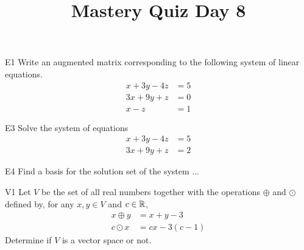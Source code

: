 \documentclass{sbgLAquiz}
\title{Mastery Quiz Day 8 }
\begin{document}
\begin{problem}{E1}
Write an augmented matrix corresponding to the following system of linear equations.
\begin{align*}
x+3y-4z &= 5 \\
3x+9y+z &= 0 \\
x-z &= 1
\end{align*}
\end{problem}

\begin{problem}{E3}
Solve the system of equations
\begin{align*}
x+3y-4z &= 5 \\
3x+9y+z &= 2
\end{align*}
\end{problem}
\newpage

\begin{problem}{E4}
Find a basis for the solution set of the system ...
\end{problem}

\begin{problem}{V1}
Let $V$ be the  set of all real numbers together with the operations $\oplus$ and $\odot$ defined by, for any $x,y \in V$ and $c \in \mathbb{R}$,
\begin{align*}
x\oplus y  &= x+y-3 \\
c \odot x &= cx-3(c-1)
\end{align*}
Determine if $V$ is a vector space or not.
\end{problem}
\end{document}

